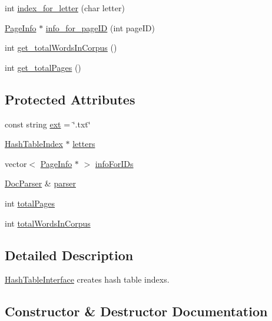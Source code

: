 \begin{DoxyCompactItemize}
\item 
int \hyperlink{class_index_interface_a9a7539d9c7a48bf4d4fbe43961c0547f}{index\+\_\+for\+\_\+letter} (char letter)
\item 
\hyperlink{class_page_info}{Page\+Info} $\ast$ \hyperlink{class_index_interface_a2af7d88c3b2701be9164ba9f4a3bddb3}{info\+\_\+for\+\_\+page\+I\+D} (int page\+I\+D)
\item 
int \hyperlink{class_index_interface_a8a0132ad6e84c4340061496c615f581c}{get\+\_\+total\+Words\+In\+Corpus} ()
\item 
int \hyperlink{class_index_interface_af9edc24ac00bdf2c0e06384f890a1d8a}{get\+\_\+total\+Pages} ()
\end{DoxyCompactItemize}
\subsection*{Protected Attributes}
\begin{DoxyCompactItemize}
\item 
const string \hyperlink{class_index_interface_acd76893126e9fd5dc63cb4ea8f56265c}{ext} = \char`\"{}.txt\char`\"{}
\item 
\hyperlink{class_hash_table_index}{Hash\+Table\+Index} $\ast$ \hyperlink{class_index_interface_a8511509bb58da989f705ba75fd5dde2d}{letters}
\item 
vector$<$ \hyperlink{class_page_info}{Page\+Info} $\ast$ $>$ \hyperlink{class_index_interface_a8400a62750faa69ff35308ff731d9ee5}{info\+For\+I\+Ds}
\item 
\hyperlink{class_doc_parser}{Doc\+Parser} \& \hyperlink{class_index_interface_a42b0d9eccd309185ed92976f72908bb9}{parser}
\item 
int \hyperlink{class_index_interface_a2df695d2b504f2e53a0bfdd6bfee31da}{total\+Pages}
\item 
int \hyperlink{class_index_interface_ab607b430e78528cdb8bb79ba4afa91d2}{total\+Words\+In\+Corpus}
\end{DoxyCompactItemize}


\subsection{Detailed Description}
\hyperlink{class_hash_table_interface}{Hash\+Table\+Interface} creates hash table index\textquotesingle{}s. 

\subsection{Constructor \& Destructor Documentation}
\hypertarget{class_hash_table_interface_afcc090bbeda66c331a7a28623aad5d0c}{}
